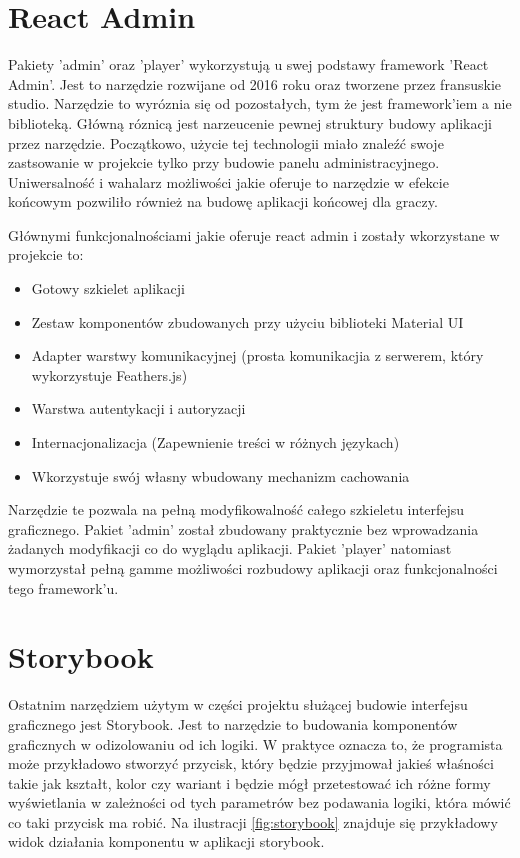 \section{React Admin}
Pakiety 'admin' oraz 'player' wykorzystują u swej podstawy framework 'React Admin'. Jest to narzędzie rozwijane od 2016 roku oraz tworzene przez fransuskie studio. Narzędzie to wyróznia się od pozostałych, tym że jest framework'iem a nie biblioteką. Główną róznicą jest narzeucenie pewnej struktury budowy aplikacji przez narzędzie. Początkowo, użycie tej technologii miało znaleźć swoje zastsowanie w projekcie tylko przy budowie panelu administracyjnego. Uniwersalność i wahalarz możliwości jakie oferuje to narzędzie w efekcie końcowym pozwiliło również na budowę aplikacji końcowej dla graczy.

Głównymi funkcjonalnościami jakie oferuje react admin i zostały wkorzystane w projekcie to:

\begin{itemize}
    \item Gotowy szkielet aplikacji
    \item Zestaw komponentów zbudowanych przy użyciu biblioteki Material UI
    \item Adapter warstwy komunikacyjnej (prosta komunikacjia z serwerem, który wykorzystuje Feathers.js)
    \item Warstwa autentykacji i autoryzacji
    \item Internacjonalizacja (Zapewnienie treści w różnych językach)
    \item Wkorzystuje swój własny wbudowany mechanizm cachowania
\end{itemize}

Narzędzie te pozwala na pełną modyfikowalność całego szkieletu interfejsu graficznego. Pakiet 'admin' został zbudowany praktycznie bez wprowadzania żadanych modyfikacji co do wyglądu aplikacji. Pakiet 'player' natomiast wymorzystał pełną gamme możliwości rozbudowy aplikacji oraz funkcjonalności tego framework'u.

\section{Storybook}
Ostatnim narzędziem użytym w części projektu służącej budowie interfejsu graficznego jest Storybook. Jest to narzędzie to budowania komponentów graficznych w odizolowaniu od ich logiki. W praktyce oznacza to, że programista może przykładowo stworzyć przycisk, który będzie przyjmował jakieś właśności takie jak kształt, kolor czy wariant i będzie mógł przetestować ich różne formy wyświetlania w zależności od tych parametrów bez podawania logiki, która mówić co taki przycisk ma robić. Na ilustracji \ref{fig:storybook} znajduje się przykładowy widok działania komponentu w aplikacji storybook.

